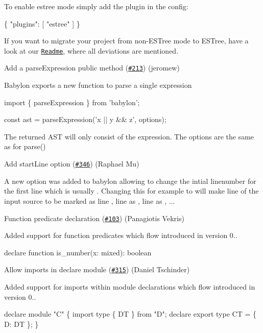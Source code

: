 To enable {\ttfamily estree} mode simply add the plugin in the config\+: 
\begin{DoxyCode}
\{
  "plugins": [ "estree" ]
\}
\end{DoxyCode}


If you want to migrate your project from non-\/\+E\+S\+Tree mode to E\+S\+Tree, have a look at our \href{https://github.com/babel/babylon/#output}{\tt Readme}, where all deviations are mentioned.

Add a parse\+Expression public method (\href{https://github.com/babel/babylon/pull/213}{\tt \#213}) (jeromew)

Babylon exports a new function to parse a single expression


\begin{DoxyCode}
import \{ parseExpression \} from 'babylon';

const ast = parseExpression('x || y && z', options);
\end{DoxyCode}


The returned A\+ST will only consist of the expression. The options are the same as for {\ttfamily parse()}

Add start\+Line option (\href{https://github.com/babel/babylon/pull/346}{\tt \#346}) (Raphael Mu)

A new option was added to babylon allowing to change the intial linenumber for the first line which is usually {}. Changing this for example to {} will make line {} of the input source to be marked as line {}, line {} as {}, line {} as {}, ...

Function predicate declaration (\href{https://github.com/babel/babylon/pull/103}{\tt \#103}) (Panagiotis Vekris)

Added support for function predicates which flow introduced in version 0..


\begin{DoxyCode}
declare function is\_number(x: mixed): boolean %
\end{DoxyCode}


Allow imports in declare module (\href{https://github.com/babel/babylon/pull/315}{\tt \#315}) (Daniel Tschinder)

Added support for imports within module declarations which flow introduced in version 0..


\begin{DoxyCode}
declare module "C" \{
  import type \{ DT \} from "D";
  declare export type CT = \{ D: DT \};
\}
\end{DoxyCode}


